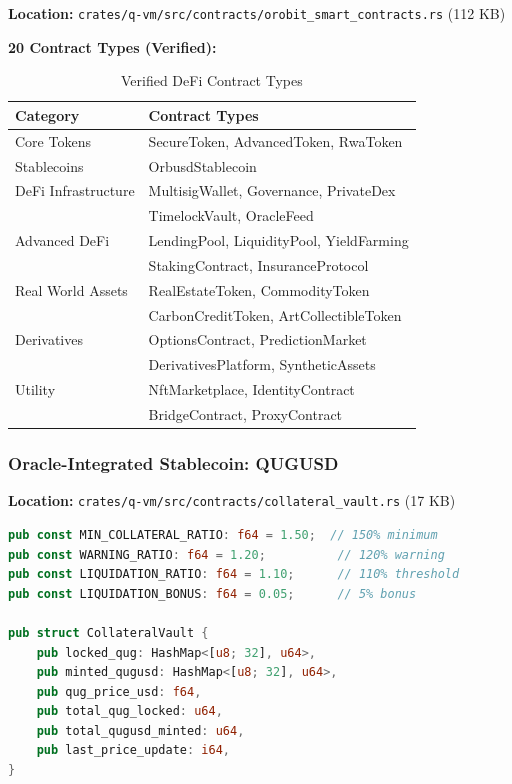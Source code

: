 \documentclass[11pt,a4paper]{article}
\begin{document}
\textbf{Location:} \texttt{crates/q-vm/src/contracts/orobit\_smart\_contracts.rs} (112 KB)

\textbf{20 Contract Types (Verified):}

\begin{table}[h]
\centering
\begin{tabular}{@{}ll@{}}
\toprule
\textbf{Category} & \textbf{Contract Types} \\ \midrule
Core Tokens & SecureToken, AdvancedToken, RwaToken \\
Stablecoins & OrbusdStablecoin \\
DeFi Infrastructure & MultisigWallet, Governance, PrivateDex \\
 & TimelockVault, OracleFeed \\
Advanced DeFi & LendingPool, LiquidityPool, YieldFarming \\
 & StakingContract, InsuranceProtocol \\
Real World Assets & RealEstateToken, CommodityToken \\
 & CarbonCreditToken, ArtCollectibleToken \\
Derivatives & OptionsContract, PredictionMarket \\
 & DerivativesPlatform, SyntheticAssets \\
Utility & NftMarketplace, IdentityContract \\
 & BridgeContract, ProxyContract \\ \bottomrule
\end{tabular}
\caption{Verified DeFi Contract Types}
\end{table}

\subsubsection{Oracle-Integrated Stablecoin: QUGUSD}

\textbf{Location:} \texttt{crates/q-vm/src/contracts/collateral\_vault.rs} (17 KB)

\begin{lstlisting}[language=Rust,caption={QUGUSD Collateral Vault Parameters}]
pub const MIN_COLLATERAL_RATIO: f64 = 1.50;  // 150% minimum
pub const WARNING_RATIO: f64 = 1.20;          // 120% warning
pub const LIQUIDATION_RATIO: f64 = 1.10;      // 110% threshold
pub const LIQUIDATION_BONUS: f64 = 0.05;      // 5% bonus

pub struct CollateralVault {
    pub locked_qug: HashMap<[u8; 32], u64>,
    pub minted_qugusd: HashMap<[u8; 32], u64>,
    pub qug_price_usd: f64,
    pub total_qug_locked: u64,
    pub total_qugusd_minted: u64,
    pub last_price_update: i64,
}
\end{lstlisting}
\end{document}
